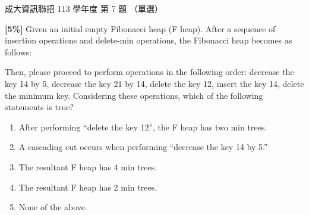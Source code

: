 \begin{pastexam}[label={px:ncku-113-prog-07}]{成大資訊聯招 113 學年度 第 7 題}
（單選）

\textbf{[5\%]} Given an initial empty Fibonacci heap (F heap). After a sequence of insertion
operations and delete-min operations, the Fibonacci heap becomes as follows:
\begin{center}
\end{center}

Then, please proceed to perform operations in the following order: decrease the key 14 by 5,
decrease the key 21 by 14, delete the key 12, insert the key 14, delete the minimum key.
Considering these operations, which of the following statements is true?
\begin{enumerate}[label=(\Alph*)]
\item After performing ``delete the key 12'', the F heap has two min trees.
\item A cascading cut occurs when performing ``decrease the key 14 by 5.''
\item The resultant F heap has 4 min trees.
\item The resultant F heap has 2 min trees.
\item None of the above.
\end{enumerate}
\end{pastexam}

